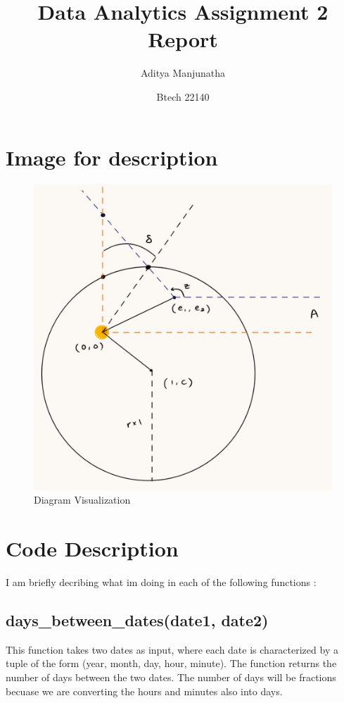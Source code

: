 \documentclass{article}
\title{Data Analytics Assignment 2 Report}
\author{Aditya Manjunatha }
\date{Btech 22140}
\begin{document}
\maketitle

\section{Image for description}

\begin{figure}[htbp]
  \centering
  \includegraphics[width=\linewidth]{Image.jpeg}
  \caption{Diagram Visualization}
  \label{fig:example}
\end{figure}

\section{Code Description}
I am briefly decribing what im doing in each of the following functions :
\subsection{days\_between\_dates(date1, date2)}
This function takes two dates as input, where each date is characterized by a tuple of the form (year, month, day, hour, minute). The function returns the number of days between the two dates. The number of days will be fractions becuase we are converting the hours and minutes also into days.
\end{document}
